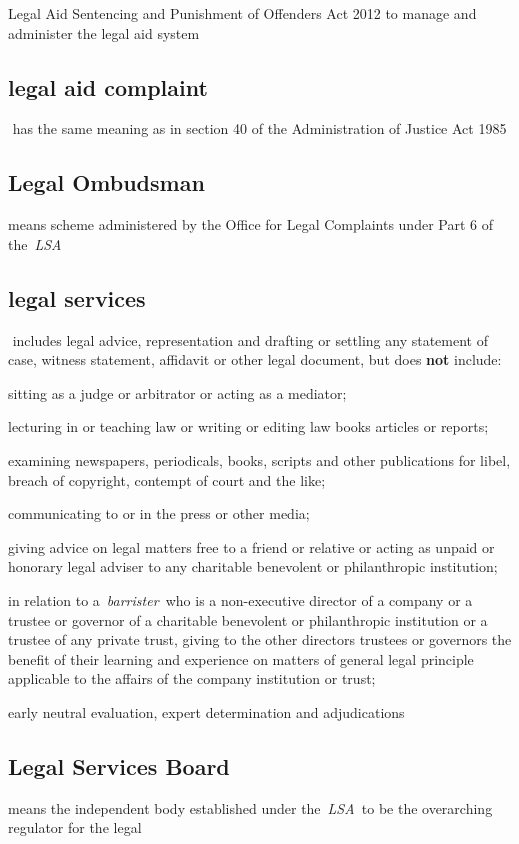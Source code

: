   Legal Aid Sentencing and Punishment of Offenders Act 2012 to manage
  and administer the legal aid system  \subsection{legal aid complaint } has the same meaning as in section 40
  of the Administration of Justice Act 1985  \subsection{Legal Ombudsman } means scheme administered by the Office for
  Legal Complaints under Part 6 of the~\emph{LSA} \subsection{legal services } includes legal advice, representation and
  drafting or settling any statement of case, witness statement,
  affidavit or other legal document, but does \textbf{not} include: \al \item  sitting as
  a judge or arbitrator or acting as a mediator; \item  lecturing in or
  teaching law or writing or editing law books articles or reports; \item  examining newspapers, periodicals, books, scripts and other
  publications for libel, breach of copyright, contempt of court and the
  like; \item  communicating to or in the press or other media; \item  giving
  advice on legal matters free to a friend or relative or acting as
  unpaid or honorary legal adviser to any charitable benevolent or
  philanthropic institution; \item  in relation to a~\emph{barrister~}who is
  a non-executive director of a company or a trustee or governor of a
  charitable benevolent or philanthropic institution or a trustee of any
  private trust, giving to the other directors trustees or governors the
  benefit of their learning and experience on matters of general legal
  principle applicable to the affairs of the company institution or
  trust; \item early neutral evaluation, expert determination and
  adjudications \la  \subsection{Legal Services Board } means the independent body established
  under the~\emph{LSA~}to be the overarching regulator for the legal
